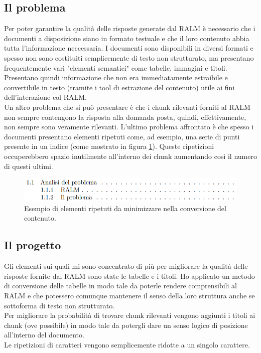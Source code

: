 \subsection{Il problema}
Per poter garantire la qualità delle risposte generate dal RALM è necessario che i documenti a disposizione siano in formato testuale e che il loro contenuto abbia tutta l'informazione 
neccessaria.
I documenti sono disponibili in diversi formati e spesso non sono costituiti semplicemente di testo non strutturato, ma presentano frequentemente vari
"elementi semantici" come tabelle, immagini e titoli.
Presentano quindi informazione che non era immediatamente estraibile e convertibile in testo (tramite i tool di estrazione del contenuto) utile ai fini dell'interazione col RALM. \\
Un altro problema che si può presentare è che i chunk rilevanti forniti al RALM non sempre contengono la risposta alla domanda posta, quindi, effettivamente, non sempre sono veramente rilevanti.
L'ultimo problema affrontato è che spesso i documenti presentano elementi ripetuti come, ad esempio, una serie di punti presente in un indice (come mostrato in figura \ref{fig:reps}).
Queste ripetizioni occuperebbero spazio inutilmente all'interno dei chunk aumentando così il numero di questi ultimi.

\begin{figure}[!h]
    \centering
    \includegraphics[width=0.8\columnwidth]{images/esempioIndice.png}
    \caption{Esempio di elementi ripetuti da minimizzare nella conversione del contenuto.}
    \label{fig:reps}
\end{figure}

\subsection{Il progetto}
Gli elementi sui quali mi sono concentrato di più per migliorare la qualità delle risposte fornite dal RALM sono state le tabelle e i titoli.
Ho applicato un metodo di conversione delle tabelle in modo tale da poterle rendere comprensibili al RALM e che potessero comunque mantenere il senso della loro struttura anche se sottoforma di testo non strutturato. \\
Per migliorare la probabilità di trovare chunk rilevanti vengono aggiunti i titoli ai chunk (ove possibile) in modo tale da potergli dare un senso logico di posizione all'interno del documento. \\
Le ripetizioni di caratteri vengono semplicemente ridotte a un singolo carattere.

